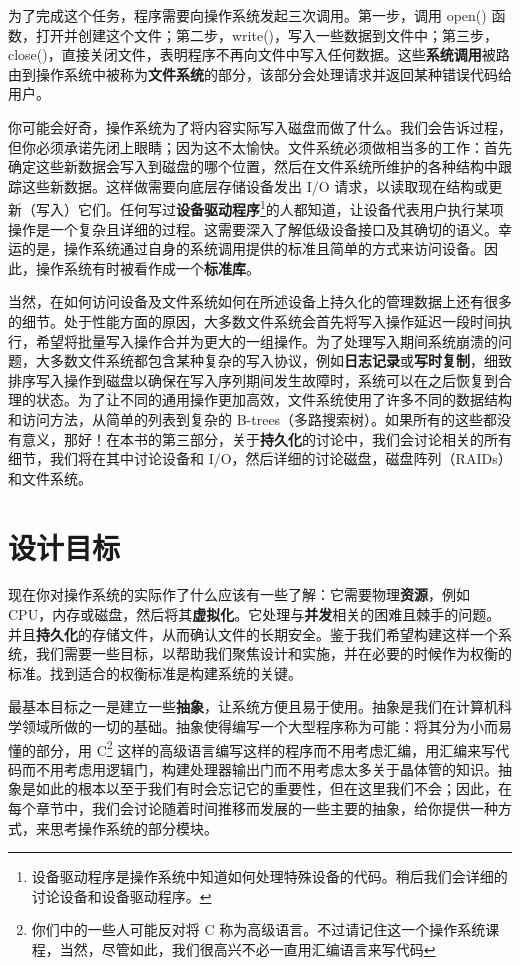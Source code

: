 为了完成这个任务，程序需要向操作系统发起三次调用。第一步，调用 open() 函数，打开并创建这个文件；第二步，write()，写入一些数据到文件中；第三步，close()，直接关闭文件，表明程序不再向文件中写入任何数据。这些\textbf{系统调用}被路由到操作系统中被称为\textbf{文件系统}的部分，该部分会处理请求并返回某种错误代码给用户。

你可能会好奇，操作系统为了将内容实际写入磁盘而做了什么。我们会告诉过程，但你必须承诺先闭上眼睛；因为这不太愉快。文件系统必须做相当多的工作：首先确定这些新数据会写入到磁盘的哪个位置，然后在文件系统所维护的各种结构中跟踪这些新数据。这样做需要向底层存储设备发出 I/O 请求，以读取现在结构或更新（写入）它们。任何写过\textbf{设备驱动程序}\footnote{设备驱动程序是操作系统中知道如何处理特殊设备的代码。稍后我们会详细的讨论设备和设备驱动程序。}的人都知道，让设备代表用户执行某项操作是一个复杂且详细的过程。这需要深入了解低级设备接口及其确切的语义。幸运的是，操作系统通过自身的系统调用提供的标准且简单的方式来访问设备。因此，操作系统有时被看作成一个\textbf{标准库}。

当然，在如何访问设备及文件系统如何在所述设备上持久化的管理数据上还有很多的细节。处于性能方面的原因，大多数文件系统会首先将写入操作延迟一段时间执行，希望将批量写入操作合并为更大的一组操作。为了处理写入期间系统崩溃的问题，大多数文件系统都包含某种复杂的写入协议，例如\textbf{日志记录}或\textbf{写时复制}，细致排序写入操作到磁盘以确保在写入序列期间发生故障时，系统可以在之后恢复到合理的状态。为了让不同的通用操作更加高效，文件系统使用了许多不同的数据结构和访问方法，从简单的列表到复杂的 B-trees（多路搜索树）。如果所有的这些都没有意义，那好！在本书的第三部分，关于\textbf{持久化}的讨论中，我们会讨论相关的所有细节，我们将在其中讨论设备和 I/O，然后详细的讨论磁盘，磁盘阵列（RAIDs）和文件系统。

\section{设计目标}
现在你对操作系统的实际作了什么应该有一些了解：它需要物理\textbf{资源}，例如 CPU，内存或磁盘，然后将其\textbf{虚拟化}。它处理与\textbf{并发}相关的困难且棘手的问题。并且\textbf{持久化}的存储文件，从而确认文件的长期安全。鉴于我们希望构建这样一个系统，我们需要一些目标，以帮助我们聚焦设计和实施，并在必要的时候作为权衡的标准。找到适合的权衡标准是构建系统的关键。

最基本目标之一是建立一些\textbf{抽象}，让系统方便且易于使用。抽象是我们在计算机科学领域所做的一切的基础。抽象使得编写一个大型程序称为可能：将其分为小而易懂的部分，用 C\footnote{你们中的一些人可能反对将 C 称为高级语言。不过请记住这一个操作系统课程，当然，尽管如此，我们很高兴不必一直用汇编语言来写代码} 这样的高级语言编写这样的程序而不用考虑汇编，用汇编来写代码而不用考虑用逻辑门，构建处理器输出门而不用考虑太多关于晶体管的知识。抽象是如此的根本以至于我们有时会忘记它的重要性，但在这里我们不会；因此，在每个章节中，我们会讨论随着时间推移而发展的一些主要的抽象，给你提供一种方式，来思考操作系统的部分模块。

